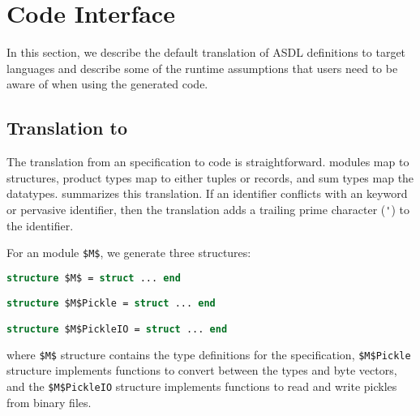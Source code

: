 %
\chapter{Code Interface}
\label{sec:code-interface}

In this section, we describe the default translation of ASDL definitions to target
languages and describe some of the runtime assumptions that users need to be aware of
when using the generated code.

\section{Translation to \sml{}}

The translation from an \asdl{} specification to \sml{} code is straightforward.
\asdl{} modules map to \sml{} structures, \asdl{} product types map to either tuples or records,
and \asdl{} sum types map the \sml{} datatypes.
 summarizes this translation.
If an \asdl{} identifier conflicts with an \sml{} keyword or pervasive identifier, then the translation
adds a trailing prime character (\lstinline[language=SML]!'!) to the identifier.

For an \asdl{} module \lstinline[mathescape=true]@$M$@, we generate three \sml{} structures:
\begin{code}\begin{lstlisting}[language=SML,mathescape=true]
structure $M$ = struct ... end

structure $M$Pickle = struct ... end

structure $M$PickleIO = struct ... end
\end{lstlisting}\end{code}
where \lstinline[language=SML,mathescape=true]@$M$@ structure contains the type definitions
for the \asdl{} specification, \lstinline[language=SML,mathescape=true]@$M$Pickle@ structure
implements functions to convert between the types and byte vectors, and the
\lstinline[language=SML,mathescape=true]@$M$PickleIO@ structure implements functions to
read and write pickles from binary files.

